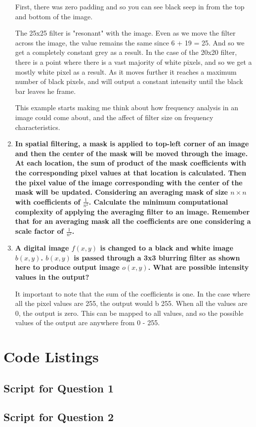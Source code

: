 \begin{enumerate}[font=\bfseries]
    First, there was zero padding and so you can see black seep in from the top
    and bottom of the image.

    The 25x25 filter is "resonant" with the image. Even as we move the filter
    across the image, the value remains the same since 6 + 19 = 25. And so we
    get a completely constant grey as a result. In the case of the 20x20 filter,
    there is a point where there is a vast majority of white pixels, and so we
    get a mostly white pixel as a result. As it moves further it reaches a
    maximum number of black pixels, and will output a constant intensity until
    the black bar leaves he frame. 

    This example starts making me think about how frequency analysis in an image
    could come about, and the affect of filter size on frequency
    characteristics.

    \item \textbf{In spatial filtering, a mask is applied to top-left corner of
    an image and then the center of the mask will be moved through the image. At
    each location, the sum of product of the mask coefficients with the
    corresponding pixel values at that location is calculated. Then the pixel
    value of the image corresponding with the center of the mask will be
    updated. Considering an averaging mask of size $n\times n$with coefficients
    of $\frac{1}{n^2}$.  Calculate the minimum computational complexity of
    applying the averaging filter to an image.  Remember that for an averaging
    mask all the coefficients are one considering a scale factor of
    $\frac{1}{n^2}$.}


    \item \textbf{A digital image $f(x,y)$ is  changed to a  black and white
    image $b(x,y)$.  $b(x,y)$ is passed through a 3x3 blurring filter as shown
    here to produce output image $o(x,y)$. What are possible intensity values in
    the output?}

    It important to note that the sum of the coefficients is one. In the case
    where all the pixel values are 255, the output would b 255. When all the
    values are 0, the output is zero. This can be mapped to all values, and so
    the possible values of the output are anywhere from 0 - 255.

\end{enumerate}

\pagebreak

\appendix

\section{Code Listings}

\subsection{Script for Question 1}



\pagebreak

\subsection{Script for Question 2}


